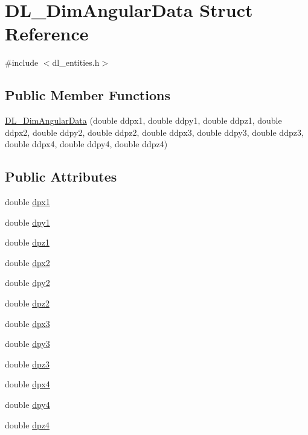 \hypertarget{structDL__DimAngularData}{\section{D\-L\-\_\-\-Dim\-Angular\-Data Struct Reference}
\label{structDL__DimAngularData}
}


{\ttfamily \#include $<$dl\-\_\-entities.\-h$>$}

\subsection*{Public Member Functions}
\begin{DoxyCompactItemize}
\item 
\hyperlink{structDL__DimAngularData_ac6a5e0ad80d5cc037cd7b7a83ebb4a19}{D\-L\-\_\-\-Dim\-Angular\-Data} (double ddpx1, double ddpy1, double ddpz1, double ddpx2, double ddpy2, double ddpz2, double ddpx3, double ddpy3, double ddpz3, double ddpx4, double ddpy4, double ddpz4)
\end{DoxyCompactItemize}
\subsection*{Public Attributes}
\begin{DoxyCompactItemize}
\item 
double \hyperlink{structDL__DimAngularData_a6c0f9261e548ee8f83fba184fe2f68da}{dpx1}
\item 
double \hyperlink{structDL__DimAngularData_a2d64d2ea63b1c699f7dd690c2935a86b}{dpy1}
\item 
double \hyperlink{structDL__DimAngularData_ab3033b1ed4a4fb8d907a4fe32eeb8e2a}{dpz1}
\item 
double \hyperlink{structDL__DimAngularData_a34636be73a8ac092e67485e9682ebd70}{dpx2}
\item 
double \hyperlink{structDL__DimAngularData_a3277c810540be21c0015ebb70162b06a}{dpy2}
\item 
double \hyperlink{structDL__DimAngularData_a3451b1049a122c631705f5016278d8b7}{dpz2}
\item 
double \hyperlink{structDL__DimAngularData_adb8ba734a623d799d7f8bb8807e09e50}{dpx3}
\item 
double \hyperlink{structDL__DimAngularData_a72afd10d24dfab7cac82c5bdbcf6f2f4}{dpy3}
\item 
double \hyperlink{structDL__DimAngularData_ac62c7f55e9411fe242b730c250a1960c}{dpz3}
\item 
double \hyperlink{structDL__DimAngularData_a189163923f5a98a706d0866f481bd2e2}{dpx4}
\item 
double \hyperlink{structDL__DimAngularData_af4f9ce6e4c38e7df538b6c0b5967b26c}{dpy4}
\item 
double \hyperlink{structDL__DimAngularData_af9cd075ea2f5fb874c237bab09f57bd2}{dpz4}
\end{DoxyCompactItemize}


